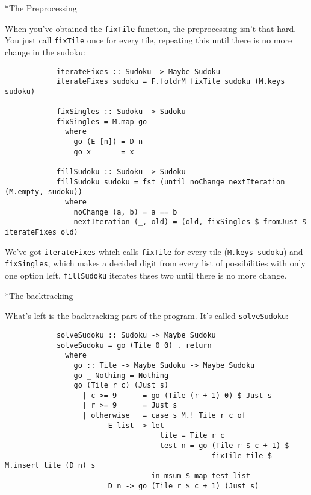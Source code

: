 \documentclass[a4paper,12pt]{article}
\begin{document}
\begin{section}
\begin{subsection}
        \begin{subsubsection}*{The Preprocessing}

            When you've obtained the \texttt{fixTile} function, the
            preprocessing isn't that hard. You just call \texttt{fixTile} once
            for every tile, repeating this until there is no more change in the
            sudoku:
            \begin{lstlisting}
            iterateFixes :: Sudoku -> Maybe Sudoku
            iterateFixes sudoku = F.foldrM fixTile sudoku (M.keys sudoku)

            fixSingles :: Sudoku -> Sudoku
            fixSingles = M.map go
              where
                go (E [n]) = D n
                go x       = x

            fillSudoku :: Sudoku -> Sudoku
            fillSudoku sudoku = fst (until noChange nextIteration (M.empty, sudoku))
              where
                noChange (a, b) = a == b
                nextIteration (_, old) = (old, fixSingles $ fromJust $ iterateFixes old)
            \end{lstlisting}

            We've got \texttt{iterateFixes} which calls \texttt{fixTile} for
            every tile (\texttt{M.keys sudoku}) and \texttt{fixSingles}, which
            makes a decided digit from every list of possibilities with only one
            option left. \texttt{fillSudoku} iterates thses two until there is
            no more change.

        \end{subsubsection}


        \begin{subsubsection}*{The backtracking}

            What's left is the backtracking part of the program. It's called
            \texttt{solveSudoku}:
            \begin{lstlisting}
            solveSudoku :: Sudoku -> Maybe Sudoku
            solveSudoku = go (Tile 0 0) . return
              where
                go :: Tile -> Maybe Sudoku -> Maybe Sudoku
                go _ Nothing = Nothing
                go (Tile r c) (Just s)
                  | c >= 9      = go (Tile (r + 1) 0) $ Just s
                  | r >= 9      = Just s
                  | otherwise   = case s M.! Tile r c of
                        E list -> let
                                    tile = Tile r c
                                    test n = go (Tile r $ c + 1) $
                                                fixTile tile $ M.insert tile (D n) s
                                  in msum $ map test list
                        D n -> go (Tile r $ c + 1) (Just s)
            \end{lstlisting}


\end{subsubsection}
\end{subsection}
\end{section}
\end{document}
